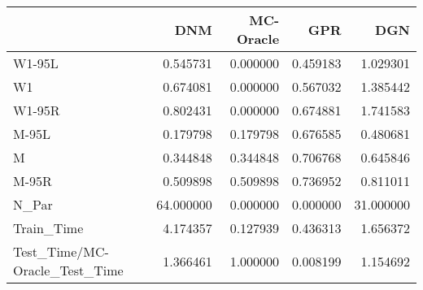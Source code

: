 \begin{tabular}{lrrrr}
\toprule
{} &        DNM &  MC-Oracle &       GPR &        DGN \\
\midrule
W1-95L                        &   0.545731 &   0.000000 &  0.459183 &   1.029301 \\
W1                            &   0.674081 &   0.000000 &  0.567032 &   1.385442 \\
W1-95R                        &   0.802431 &   0.000000 &  0.674881 &   1.741583 \\
M-95L                         &   0.179798 &   0.179798 &  0.676585 &   0.480681 \\
M                             &   0.344848 &   0.344848 &  0.706768 &   0.645846 \\
M-95R                         &   0.509898 &   0.509898 &  0.736952 &   0.811011 \\
N\_Par                         &  64.000000 &   0.000000 &  0.000000 &  31.000000 \\
Train\_Time                    &   4.174357 &   0.127939 &  0.436313 &   1.656372 \\
Test\_Time/MC-Oracle\_Test\_Time &   1.366461 &   1.000000 &  0.008199 &   1.154692 \\
\bottomrule
\end{tabular}

